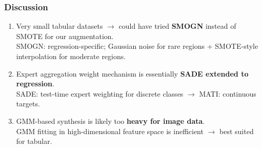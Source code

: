 \documentclass[10pt,aspectratio=169]{beamer}
\begin{document}
\begin{frame}
\frametitle{Discussion}
{\small
\begin{enumerate}\setlength\itemsep{10pt}
  \item Very small tabular datasets $\rightarrow$ could have tried \textbf{SMOGN} instead of SMOTE for our augmentation.\\
        {\scriptsize SMOGN: regression-specific; Gaussian noise for rare regions + SMOTE-style interpolation for moderate regions.}

  \item Expert aggregation weight mechanism is essentially \textbf{SADE extended to regression}.\\
        {\scriptsize SADE: test-time expert weighting for discrete classes $\rightarrow$ MATI: continuous targets.}

  \item GMM-based synthesis is likely too \textbf{heavy for image data}.\\
        {\scriptsize GMM fitting in high-dimensional feature space is inefficient $\rightarrow$ best suited for tabular.}
\end{enumerate}
}
\end{frame}



\end{document}

